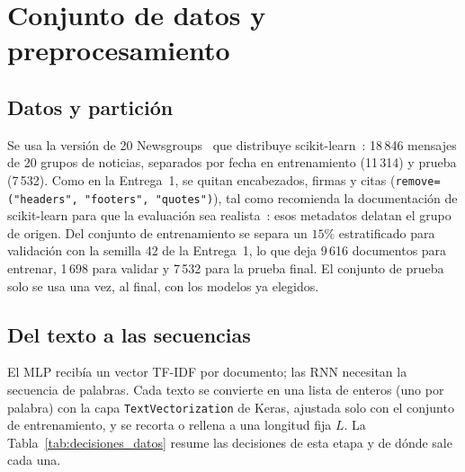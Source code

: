 \documentclass[12pt, a4paper]{article}
\begin{document}
\section{Conjunto de datos y preprocesamiento}\label{sec:datos}

\subsection{Datos y partición}

Se usa la versión de 20 Newsgroups~\cite{lang1995newsweeder} que distribuye scikit-learn~\cite{pedregosa2011scikit}: 18\,846 mensajes de 20 grupos de noticias, separados por fecha en entrenamiento (11\,314) y prueba (7\,532). Como en la Entrega~1, se quitan encabezados, firmas y citas (\texttt{remove=("headers", "footers", "quotes")}), tal como recomienda la documentación de scikit-learn para que la evaluación sea realista~\cite{sklearn20ng}: esos metadatos delatan el grupo de origen. Del conjunto de entrenamiento se separa un $15\%$ estratificado para validación con la semilla 42 de la Entrega~1, lo que deja 9\,616 documentos para entrenar, 1\,698 para validar y 7\,532 para la prueba final. El conjunto de prueba solo se usa una vez, al final, con los modelos ya elegidos.

\subsection{Del texto a las secuencias}

El MLP recibía un vector TF-IDF por documento; las RNN necesitan la secuencia de palabras. Cada texto se convierte en una lista de enteros (uno por palabra) con la capa \texttt{TextVectorization} de Keras, ajustada solo con el conjunto de entrenamiento, y se recorta o rellena a una longitud fija $L$. La Tabla~\ref{tab:decisiones_datos} resume las decisiones de esta etapa y de dónde sale cada una.
\end{document}
